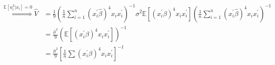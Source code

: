 \begin{eg}
\begin{align*}
        \overset{\mathbb{E}[u_i^2|x_i]=0}{\Longrightarrow} \hat{V} &= \frac{1}{9}\left(\frac{1}{n} \sum_{i=1}^{n} (x_i^{\prime} \hat{\beta})^4 x_i x_i^{\prime} \right)^{-1} \sigma^2\mathbb{E}\left[(x_i^{\prime} \beta)^4 x_i x_i^{\prime} \right] \left(\frac{1}{n} \sum_{i=1}^{n} (x_i^{\prime} \hat{\beta})^4 x_i x_i^{\prime} \right)^{-1} \\
        &= \frac{\hat{\sigma}^2}{9} \left(\mathbb{E}\left[(x_i^{\prime} \beta)^4 x_i x_i^{\prime} \right]\right)^{-1} \\
        &= \frac{\hat{\sigma}^2}{9} \left[\frac{1}{n} \sum (x_i^{\prime} \beta)^4 x_i x_i^{\prime} \right]^{-1} \\
    \end{align*}

\end{eg}
